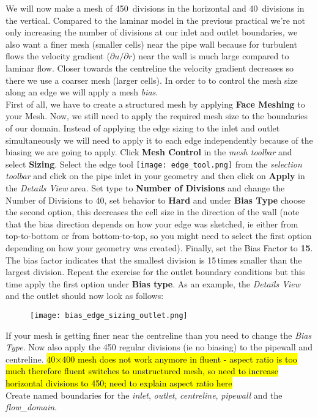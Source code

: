\documentclass[11pt,a4paper,oneside]{scrartcl}
\newcommand\bfr[1]{\textcolor[rgb]{1,0.00,0.00}{\textbf{\textsf{#1}}}}
\begin{document}
We will now make a mesh of 450~divisions in the horizontal and 40~divisions in the vertical. Compared to the laminar model in the previous practical we're not only increasing the number of divisions at our inlet and outlet boundaries, we also want a finer mesh (smaller cells) near the pipe wall because for turbulent flows the velocity gradient ($\partial u/\partial r$) near the wall is much large compared to laminar flow. Closer towards the centreline the velocity gradient decreases so there we use a coarser mesh (larger cells). In order to to control the mesh size along an edge we will apply a mesh \emph{bias}.\\

First of all, we have to create a structured mesh by applying \bfr{Face Meshing} to your Mesh. Now, we still need to apply the required mesh size to the boundaries of our domain. Instead of applying the edge sizing to the inlet and outlet simultaneously we will need to apply it to each edge independently because of the biasing we are going to apply. Click \bfr{Mesh Control} in the \emph{mesh toolbar} and select \bfr{Sizing}. Select the edge tool \texttt{[image: edge\_tool.png]} from the \emph{selection toolbar} and click on the pipe inlet in your geometry and then click on \bfr{Apply} in the \emph{Details View} area. Set type to \bfr{Number of Divisions} and change the Number of Divisions to 40, set behavior to \bfr{Hard} and under \bfr{Bias Type} choose the second option, this decreases the cell size in the direction of the wall (note that the bias direction depends on how your edge was sketched, ie either from top-to-bottom or from bottom-to-top, so you might need to select the first option depending on how your geometry was created). Finally, set the Bias Factor to \bfr{15}. The bias factor indicates that the smallest division is 15\,times smaller than the largest division. Repeat the exercise for the outlet boundary conditions but this time apply the first option under \bfr{Bias type}. As an example, the \emph{Details View} and the outlet should now look as follows:

        \begin{figure}[H]
        \begin{center}
        \texttt{[image: bias\_edge\_sizing\_outlet.png]}
        \end{center}
        \end{figure}

If your mesh is getting finer near the centreline than you need to change the \emph{Bias Type}. Now also apply the 450 regular divisions (ie no biasing) to the pipewall and centreline. \hl{40$\times$400 mesh does not work anymore in fluent - aspect ratio is too much therefore fluent switches to unstructured mesh, so need to increase horizontal divisions to 450; need to explain aspect ratio here}\\
Create named boundaries for the \emph{inlet}, \emph{outlet}, \emph{centreline}, \emph{pipewall} and the \emph{flow\_domain}.
\end{document}
